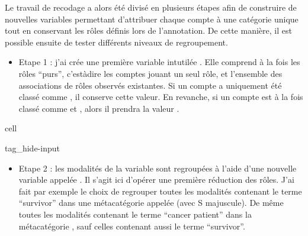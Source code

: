 \documentclass[letterpaper,10pt,english]{jupyterBook}
\begin{document}
\sphinxAtStartPar
Le travail de recodage a alors été divisé en plusieurs étapes afin de construire de nouvelles variables permettant d’attribuer chaque compte à une catégorie unique tout en conservant les rôles définis lors de l’annotation. De cette manière, il est possible ensuite de tester différents niveaux de regroupement.
\begin{itemize}
\item {} 
\sphinxAtStartPar
Etape 1 : j’ai crée une première variable intutilée . Elle comprend à la fois les rôles “purs”, c’est\sphinxhyphen{}à\sphinxhyphen{}dire les comptes jouant un seul rôle, et l’ensemble des associations de rôles observés existantes. Si un compte a uniquement été classé comme , il conserve cette valeur. En revanche, si un compte est à la fois classé comme  et , alors il prendra la valeur .

\end{itemize}

\begin{sphinxuseclass}{cell}
\begin{sphinxuseclass}{tag_hide-input}
\end{sphinxuseclass}
\end{sphinxuseclass}\begin{itemize}
\item {} 
\sphinxAtStartPar
Etape 2 : les modalités de la variable  sont regroupées à l’aide d’une nouvelle variable appelée . Il s’agit ici d’opérer une première réduction des rôles. J’ai fait par exemple le choix de regrouper toutes les modalités contenant le terme “survivor” dans une méta\sphinxhyphen{}catégorie appelée  (avec S majuscule). De même toutes les modalités contenant le terme “cancer patient” dans la méta\sphinxhyphen{}catégorie , sauf celles contenant aussi le terme “survivor”.

\end{itemize}
\end{document}
